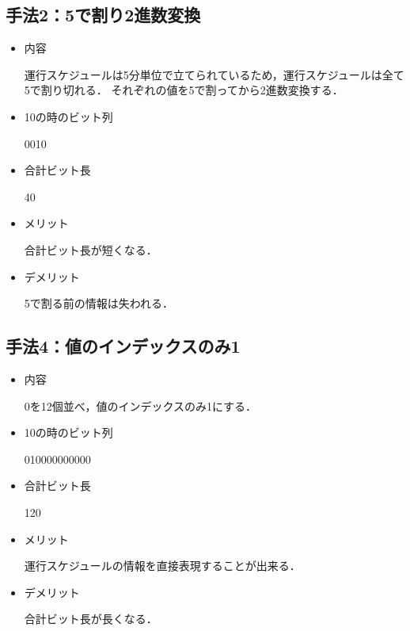 \documentclass[main]{subfiles}
\begin{document}
        \subsection{手法2：5で割り2進数変換}
        \begin{itemize}
            \item 内容
            
                運行スケジュールは5分単位で立てられているため，運行スケジュールは全て5で割り切れる．
                それぞれの値を5で割ってから2進数変換する．
            \item 10の時のビット列
                
                0010
            \item 合計ビット長
            
                40
            \item メリット
            
                合計ビット長が短くなる．
            \item デメリット
                
                5で割る前の情報は失われる．
            
        \end{itemize}
        \subsection{手法4：値のインデックスのみ1}
        \begin{itemize}
            \item 内容
            
                0を12個並べ，値のインデックスのみ1にする．
            \item 10の時のビット列
                
                010000000000
            \item 合計ビット長
            
                120
            \item メリット
            
                運行スケジュールの情報を直接表現することが出来る．
            \item デメリット
                
                合計ビット長が長くなる．
            
        \end{itemize}
\end{document}
